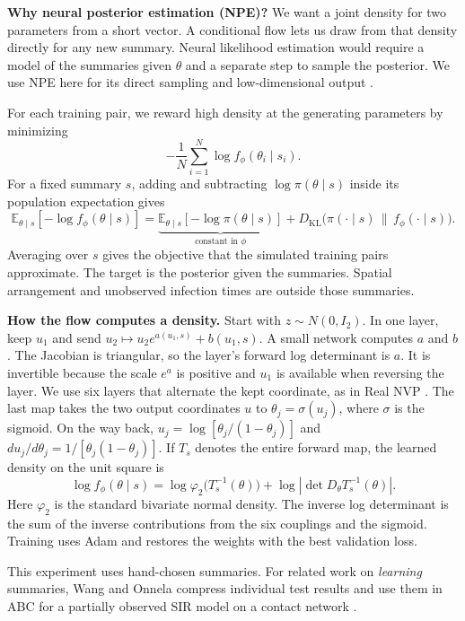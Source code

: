 \documentclass[11pt]{article}
\begin{document}
\textbf{Why neural posterior estimation (NPE)?}
We want a joint density for two parameters from a short vector. A conditional
flow lets us draw from that density directly for any new summary. Neural
likelihood estimation would require a model of the summaries given $\theta$
and a separate step to sample the posterior. We use NPE here for its direct
sampling and low-dimensional output \cite{npe}.

For each training pair, we reward high density at the generating parameters
by minimizing
\[
-\frac{1}{N}\sum_{i=1}^{N}\log f_\phi(\theta_i\mid s_i).
\]
For a fixed summary $s$, adding and subtracting $\log \pi(\theta\mid s)$
inside its population expectation gives
\[
\mathbb E_{\theta\mid s}\!\left[-\log f_\phi(\theta\mid s)\right]
=
\underbrace{\mathbb E_{\theta\mid s}[-\log\pi(\theta\mid s)]}_{\text{constant in }\phi}
+
D_{\mathrm{KL}}\bigl(\pi(\cdot\mid s)\,\|\, f_\phi(\cdot\mid s)\bigr).
\]
Averaging over $s$ gives the objective that the simulated training pairs
approximate. The target is the posterior given the summaries. Spatial
arrangement and unobserved infection times are outside those summaries.

\textbf{How the flow computes a density.}
Start with $z\sim N(0,I_2)$. In one layer, keep $u_1$ and send
$u_2\mapsto u_2e^{a(u_1,s)}+b(u_1,s)$. A small network computes $a$ and $b$.
The Jacobian is triangular, so the layer's forward log determinant is $a$.
It is invertible because the scale $e^a$ is positive and $u_1$ is available
when reversing the layer. We use six layers that alternate the kept
coordinate, as in Real NVP \cite{realnvp}. The last map takes the two output
coordinates $u$ to $\theta_j=\sigma(u_j)$, where $\sigma$ is the sigmoid.
On the way back, $u_j=\log[\theta_j/(1-\theta_j)]$ and
$du_j/d\theta_j=1/[\theta_j(1-\theta_j)]$. If $T_s$ denotes the entire
forward map, the learned density on the unit square is
\[
\log f_\phi(\theta\mid s)
=\log\varphi_2\bigl(T_s^{-1}(\theta)\bigr)
 +\log\left|\det D_\theta T_s^{-1}(\theta)\right|.
\]
Here $\varphi_2$ is the standard bivariate normal density. The inverse log
determinant is the sum of the inverse contributions from the six couplings
and the sigmoid. Training uses Adam and restores the weights with the best
validation loss.

This experiment uses hand-chosen summaries. For related work on
\emph{learning} summaries, Wang and Onnela compress individual test results
and use them in ABC for a partially observed SIR model on a contact
network \cite{wang}.
\end{document}
